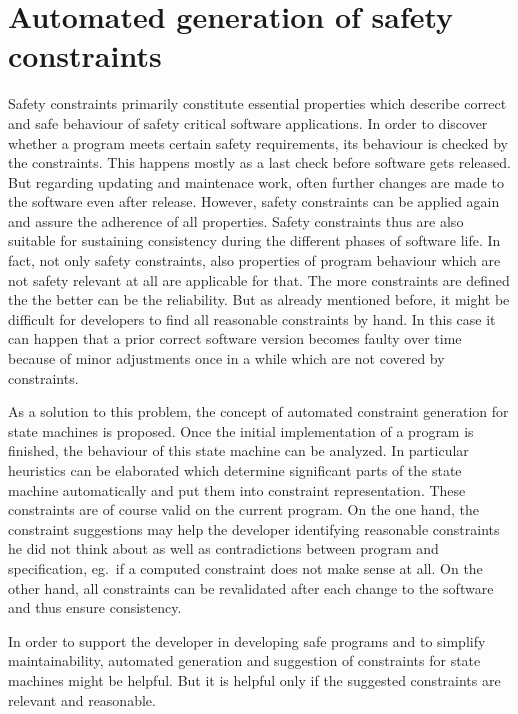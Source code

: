 \chapter{Automated generation of safety constraints}
\label{chap:automatedgenerationofsafetyconstraints}

Safety constraints primarily constitute essential properties which describe correct and safe behaviour of safety critical software applications. In order to discover whether a program meets certain safety requirements, its behaviour is checked by the constraints. This happens mostly as a last check before software gets released. 
But regarding updating and maintenace work, often further changes are made to the software even after release.
However, safety constraints can be applied again and assure the adherence of all properties. Safety constraints thus are also suitable for sustaining consistency during the different phases of software life. In fact, not only safety constraints, also properties of program behaviour which are not safety relevant at all are applicable for that. The more constraints are defined the the better can be the reliability.
But as already mentioned before, it might be difficult for developers to find all reasonable %
constraints by hand. %
In this case it can happen that a prior correct software version becomes faulty over time because of minor adjustments once in a while which are not covered by constraints.

As a solution to this problem, the concept of automated constraint generation for state machines is proposed. Once the initial implementation of a program is finished, the behaviour of this state machine can be analyzed. In particular heuristics can be elaborated which determine significant parts of the state machine automatically and put them into constraint representation. These constraints are of course valid on the current program.
On the one hand, the constraint suggestions may help the developer identifying reasonable constraints he did not think about as well as contradictions between program and specification, eg.\ if a computed constraint does not make sense at all.
On the other hand, all constraints can be revalidated after each change to the software and thus ensure consistency.

In order to support the developer in developing safe programs and to simplify maintainability, automated generation and suggestion of constraints for state machines might be helpful. But it is helpful only if the suggested constraints are relevant and reasonable.


